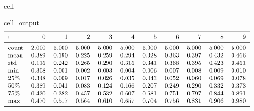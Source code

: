 \documentclass[letterpaper,table,10pt,english]{jupyterBook}
\begin{document}
\begin{sphinxuseclass}{cell}
\begin{sphinxVerbatimOutput}
\begin{sphinxuseclass}{cell_output}\begin{equation*}
\begin{split}\begin{tabular}{lrrrrrrrrrr}
\toprule
t &      0 &      1 &      2 &      3 &      4 &      5 &      6 &      7 &      8 &      9 \\
\midrule
count &  2.000 &  5.000 &  5.000 &  5.000 &  5.000 &  5.000 &  5.000 &  5.000 &  5.000 &  5.000 \\
mean  &  0.389 &  0.190 &  0.225 &  0.259 &  0.294 &  0.328 &  0.363 &  0.397 &  0.432 &  0.466 \\
std   &  0.115 &  0.242 &  0.265 &  0.290 &  0.315 &  0.341 &  0.368 &  0.395 &  0.423 &  0.451 \\
min   &  0.308 &  0.001 &  0.002 &  0.003 &  0.004 &  0.006 &  0.007 &  0.008 &  0.009 &  0.010 \\
25\%   &  0.348 &  0.009 &  0.017 &  0.026 &  0.035 &  0.043 &  0.052 &  0.060 &  0.069 &  0.078 \\
50\%   &  0.389 &  0.041 &  0.083 &  0.124 &  0.166 &  0.207 &  0.249 &  0.290 &  0.332 &  0.373 \\
75\%   &  0.430 &  0.382 &  0.457 &  0.532 &  0.607 &  0.681 &  0.751 &  0.797 &  0.844 &  0.891 \\
max   &  0.470 &  0.517 &  0.564 &  0.610 &  0.657 &  0.704 &  0.756 &  0.831 &  0.906 &  0.980 \\
\bottomrule
\end{tabular}\end{split}
\end{equation*}
\end{sphinxuseclass}\end{sphinxVerbatimOutput}

\end{sphinxuseclass}
\end{document}
